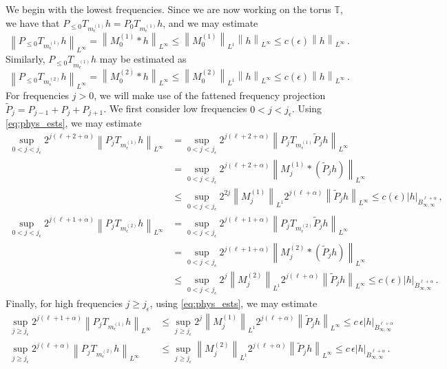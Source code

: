 \documentclass[11pt,reqno]{amsart}
\newcommand{\T}{\mathbb{T}}
\newcommand{\abs}[1]{\left\lvert #1 \right\rvert}
\newcommand{\norm}[1]{\left\lVert #1 \right\rVert}
\newcommand{\wt}[1]{\widetilde{#1}}
\theoremstyle{definition}
\begin{document}
We begin with the lowest frequencies. Since we are now working on the torus $\T$, we have that $P_{\le 0}T_{m^{(1)}_\epsilon}h = P_0T_{m^{(1)}_\epsilon}h$, and we may estimate 
\begin{equation}
  \norm{P_{\le 0}T_{m^{(1)}_\epsilon}h}_{L^\infty} = \norm{M_0^{(1)}*h}_{L^\infty} 
  \le \norm{M_0^{(1)}}_{L^1}\norm{h}_{L^\infty}
  \le c(\epsilon)\norm{h}_{L^\infty}\,.
\end{equation}
Similarly, $P_{\le 0}T_{m^{(1)}_\epsilon}h$ may be estimated as
\begin{equation}
  \norm{P_{\le 0}T_{m^{(2)}_\epsilon}h}_{L^\infty} = \norm{M_0^{(2)}*h}_{L^\infty} 
  \le \norm{M_0^{(2)}}_{L^1}\norm{h}_{L^\infty}
  \le c(\epsilon)\norm{h}_{L^\infty}\,.
\end{equation}
%
%
%
For frequencies  $j>0$, we will make use of the fattened frequency projection $\wt P_j=P_{j-1}+P_j+P_{j+1}$.
We first consider low frequencies $0<j<j_\epsilon$. Using \eqref{eq:phys_ests}, we may estimate
\begin{equation}
\begin{aligned}
  \sup_{0<j< j_\epsilon} 2^{j(\ell+2+\alpha)}\norm{P_jT_{m^{(1)}_\epsilon}h}_{L^\infty} 
  &= \sup_{0<j< j_\epsilon} 2^{j(\ell+2+\alpha)}\norm{P_jT_{m^{(1)}_\epsilon}\wt P_jh}_{L^\infty}\\
  &=\sup_{0<j< j_\epsilon} 2^{j(\ell+2+\alpha)}\norm{M_j^{(1)}*(\wt P_jh)}_{L^\infty} \\
  &\le \sup_{0<j< j_\epsilon} 2^{2j}\norm{M_j^{(1)}}_{L^1}2^{j(\ell+\alpha)}\norm{\wt P_jh}_{L^\infty}
  \le c(\epsilon)\abs{h}_{\dot B^{\ell+\alpha}_{\infty,\infty}}\,,
  \\
  \sup_{0<j< j_\epsilon} 2^{j(\ell+1+\alpha)}\norm{P_jT_{m^{(2)}_\epsilon}h}_{L^\infty}  &= \sup_{0<j< j_\epsilon} 2^{j(\ell+1+\alpha)}\norm{P_jT_{m^{(2)}_\epsilon}\wt P_jh}_{L^\infty}\\
  &=\sup_{0<j< j_\epsilon} 2^{j(\ell+1+\alpha)}\norm{M_j^{(2)}*(\wt P_jh)}_{L^\infty} \\
  &\le \sup_{0<j< j_\epsilon} 2^j\norm{M_j^{(2)}}_{L^1}2^{j(\ell+\alpha)}\norm{\wt P_jh}_{L^\infty}
  \le c(\epsilon)\abs{h}_{\dot B^{\ell+\alpha}_{\infty,\infty}}\,.
\end{aligned}
\end{equation}
%
%
Finally, for high frequencies $j\ge j_\epsilon$, using \eqref{eq:phys_ests}, we may estimate
\begin{equation}
\begin{aligned}
  \sup_{j\ge j_\epsilon} 2^{j(\ell+1+\alpha)}\norm{P_jT_{m^{(1)}_\epsilon}h}_{L^\infty} &\le \sup_{j\ge j_\epsilon} 2^j\norm{M_j^{(1)}}_{L^1} 2^{j(\ell+\alpha)}\norm{\wt P_jh}_{L^\infty}
  \le c\,\epsilon\abs{h}_{\dot B^{\ell+\alpha}_{\infty,\infty}} \\
%
%
  \sup_{j\ge j_\epsilon} 2^{j(\ell+\alpha)}\norm{P_jT_{m^{(2)}_\epsilon}h}_{L^\infty} &\le 
  \sup_{j\ge j_\epsilon} \norm{M_j^{(2)}}_{L^1}2^{j(\ell+\alpha)}\norm{\wt P_jh}_{L^\infty}
  \le c\,\epsilon\abs{h}_{\dot B^{\ell+\alpha}_{\infty,\infty}}\,.
\end{aligned}
\end{equation}
\end{document}
